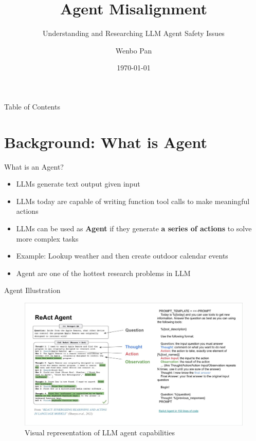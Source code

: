 \documentclass[aspectratio=169,12pt]{beamer}
\title{Agent Misalignment}
\subtitle{Understanding and Researching LLM Agent Safety Issues}
\author{Wenbo Pan}
\date{\today}
\begin{document}
\begin{frame}[standout]
    \titlepage
\end{frame}

\begin{frame}{Table of Contents}
    \tableofcontents
\end{frame}

\section{Background: What is Agent}
\begin{frame}{What is an Agent?}
    \begin{itemize}
        \item LLMs generate text output given input
        \item LLMs today are capable of writing function tool calls to make meaningful actions
        \item LLMs can be used as \textbf{Agent} if they generate \textbf{a series of actions} to solve more complex tasks
        \item Example: Lookup weather and then create outdoor calendar events
        \item Agent are one of the hottest research problems in LLM
    \end{itemize}
\end{frame}

\begin{frame}{Agent Illustration}
    \begin{figure}
        \includegraphics[width=\columnwidth,height=0.65\textheight,keepaspectratio]{attachment/58b89e6dab454c0dfc5468eef8802e55.png}
        \caption{Visual representation of LLM agent capabilities}
    \end{figure}
\end{frame}
\end{document}
